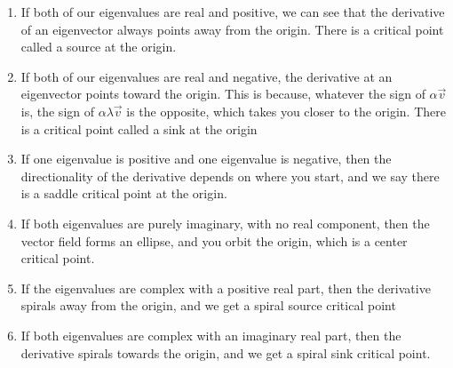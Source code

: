\documentclass{article}
\begin{document}
\begin{proposition}
    \begin{enumerate}
        \item If both of our eigenvalues are real and positive, we can see that the derivative of an eigenvector always points away from the origin. There is a critical point called a source at the origin.

\item If both of our eigenvalues are real and negative, the derivative at an eigenvector points toward the origin. This is because, whatever the sign of $\alpha \vec{v}$ is, the sign of $\alpha\lambda\vec{v}$ is the opposite, which takes you closer to the origin. There is a critical point called a sink at the origin

\item If one eigenvalue is positive and one eigenvalue is negative, then the directionality of the derivative depends on where you start, and we say there is a saddle critical point at the origin.

\item If both eigenvalues are purely imaginary, with no real component, then the vector field forms an ellipse, and you orbit the origin, which is a center critical point.
\item If the eigenvalues are complex with a positive real part, then the derivative spirals away from the origin, and we get a spiral source critical point
\item If both eigenvalues are complex with an imaginary real part, then the derivative spirals towards the origin, and we get a spiral sink critical point.
    \end{enumerate}

\end{proposition}
\end{document}
